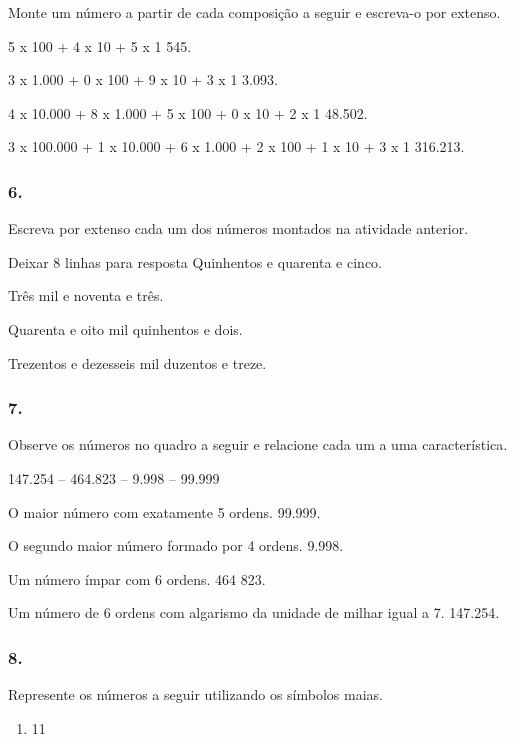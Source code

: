 \begin{enumerate}
Monte um número a partir de cada composição a seguir e escreva-o por extenso.

\begin{escolha}
\def\labelenumi{\alph{enumi})}
\item 5 x 100 + 4 x 10 + 5 x 1
545.
\item 3 x 1.000 + 0 x 100 + 9 x 10 + 3 x 1
3.093.
\item 4 x 10.000 + 8 x 1.000 + 5 x 100 + 0 x 10 + 2 x 1
48.502.
\item 3 x 100.000 + 1 x 10.000 + 6 x 1.000 + 2 x 100 + 1 x 10 + 3 x 1
316.213.
\end{escolha}

\subsubsection{6.}\label{section-5}

Escreva por extenso cada um dos números montados na atividade anterior.

Deixar 8 linhas para resposta
Quinhentos e quarenta e cinco.

Três mil e noventa e três.

Quarenta e oito mil quinhentos e dois.

Trezentos e dezesseis mil duzentos e treze.

\subsubsection{7.}\label{section-6}

Observe os números no quadro a seguir e relacione cada um a uma característica.

147.254 -- 464.823 -- 9.998 -- 99.999

O maior número com exatamente 5 ordens.
99.999.

O segundo maior número formado por 4 ordens.
9.998.

Um número ímpar com 6 ordens.
464 823.

Um número de 6 ordens com algarismo da unidade de milhar igual a 7.
147.254.


\subsubsection{8.}\label{section-7}

Represente os números a seguir utilizando os símbolos maias.

\begin{enumerate}
\def\labelenumi{\alph{enumi})}
\item
  11
\end{enumerate}


\end{enumerate}
